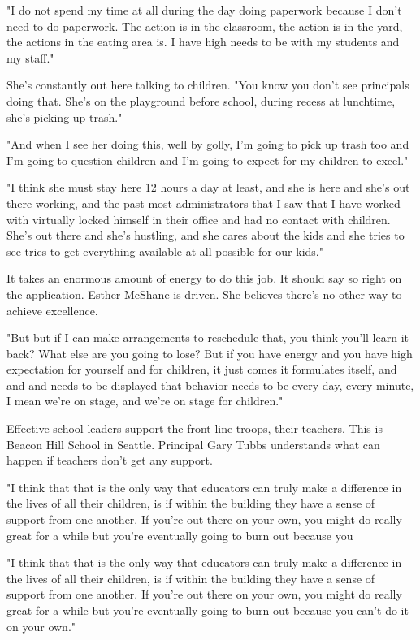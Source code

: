 "I do not spend my time at all during the day doing paperwork because I don't need to do paperwork.
The action is in the classroom, the action is in the yard, the actions in the eating area is.
I have high needs to be with my students and my staff."

She's constantly out here talking to children.
"You know you don't see principals doing that.
She's on the playground before school, during recess at lunchtime, she's picking up trash."

"And when I see her doing this, well by golly, I'm going to pick up trash too and I'm going to question children and I'm going to expect for my children to excel."

"I think she must stay here 12 hours a day at least, and she is here and she's out there working, and the past most administrators that I saw that I have worked with virtually locked himself in their office and had no contact with children.
She's out there and she's hustling, and she cares about the kids and she tries to see tries to get everything available at all possible for our kids."

It takes an enormous amount of energy to do this job.
It should say so right on the application.
Esther McShane is driven.
She believes there's no other way to achieve excellence.

"But but if I can make arrangements to reschedule that, you think you'll learn it back?
What else are you going to lose?
But if you have energy and you have high expectation for yourself and for children, it just comes it formulates itself, and and and needs to be displayed that behavior needs to be every day, every minute, I mean we're on stage, and we're on stage for children."

Effective school leaders support the front line troops, their teachers.
This is Beacon Hill School in Seattle.
Principal Gary Tubbs understands what can happen if teachers don't get any support.

"I think that that is the only way that educators can truly make a difference in the lives of all their children, is if within the building they have a sense of support from one another.
If you're out there on your own, you might do really great for a while but you're eventually going to burn out because you

"I think that that is the only way that educators can truly make a difference in the lives of all their children, is if within the building they have a sense of support from one another.
If you're out there on your own, you might do really great for a while but you're eventually going to burn out because you can't do it on your own."

